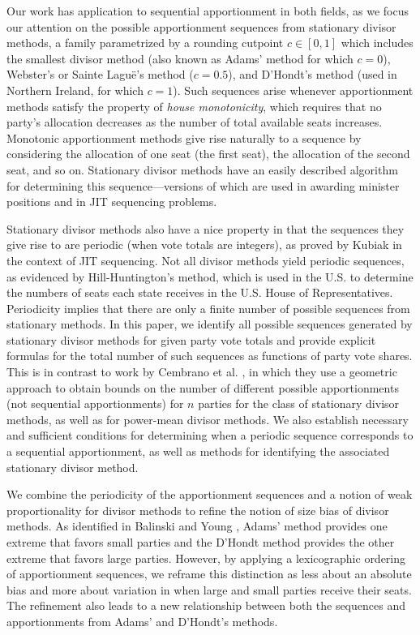 \documentclass[pdflatex,sn-mathphys-num]{sn-jnl}
\theoremstyle{thmstyleone}%
\theoremstyle{thmstyletwo}%
\theoremstyle{thmstylethree}%
\begin{document}
Our work has application to sequential apportionment in both fields, as we focus our attention on the possible apportionment sequences from stationary divisor methods, a family parametrized by a rounding cutpoint $c \in [0, 1]$ which includes the smallest divisor method (also known as Adams' method for which $c=0$), Webster's or Sainte Lagu\"e's method ($c=0.5$), and D'Hondt's method (used in Northern Ireland, for which $c=1$). Such sequences arise  whenever apportionment methods satisfy the property of {\it house monotonicity}, which requires that no party's allocation decreases as the number of total available seats increases.  Monotonic apportionment methods give rise naturally to a sequence by considering the allocation of one seat (the first seat), the allocation of the second seat, and so on. Stationary divisor methods have an easily described algorithm for determining this sequence---versions of which are used in awarding minister positions and in JIT sequencing problems.

Stationary divisor methods also have a nice property in that the sequences they give rise to are periodic (when vote totals are integers), as proved by Kubiak \cite{K} in the context of JIT sequencing. Not all divisor methods yield periodic sequences, as evidenced by Hill-Huntington's method, which is used in the U.S. to determine the numbers of seats each state receives in the U.S. House of Representatives.  Periodicity implies that there are only a finite number of possible sequences from stationary methods. In this paper, we identify all possible sequences generated by stationary divisor methods for given party vote totals and provide explicit formulas for the total number of such sequences as functions of party vote shares. This is in contrast to work by Cembrano et al.  \cite{CCSTV}, in which they use a geometric approach to obtain bounds on the number of different possible apportionments (not sequential apportionments) for $n$ parties for the class of stationary divisor methods, as well as for power-mean divisor methods.  We also establish necessary and sufficient conditions for determining when a periodic sequence corresponds to a sequential apportionment, as well as methods for identifying the associated stationary divisor method.

We combine the periodicity of the apportionment sequences and a notion of weak proportionality for divisor methods to refine the notion of size bias of divisor methods. As identified in Balinski and Young \cite{BY}, Adams' method provides  one extreme  that favors small parties and the D'Hondt method  provides the other extreme that favors large parties.  However, by applying a lexicographic ordering of apportionment sequences, we reframe this distinction as less about an absolute bias and more about variation in when large and small parties receive their seats. The refinement also  leads to a new relationship between both the sequences and apportionments from Adams' and D'Hondt's methods.
\end{document}

